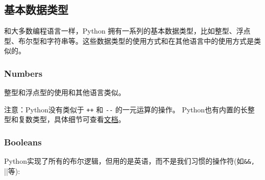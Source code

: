 \subsection{基本数据类型}

%
%

和大多数编程语言一样，Python 拥有一系列的基本数据类型，比如整型、浮点型、布尔型和字符串等。这些数据类型的使用方式和在其他语言中的使用方式是类似的。


\subsubsection{Numbers}
整型和浮点型的使用和其他语言类似。



%

注意：Python没有类似于 \lstinline|++| 和 \lstinline|--| 的一元运算的操作。 Python也有内置的长整型和复数类型，具体细节可查看\href{https://docs.python.org/3.5/library/stdtypes.html#numeric-types-int-float-complex}{文档}。


%

\subsubsection{Booleans}
Python实现了所有的布尔逻辑，但用的是英语，而不是我们习惯的操作符(如\lstinline|&&, |||等):



%



